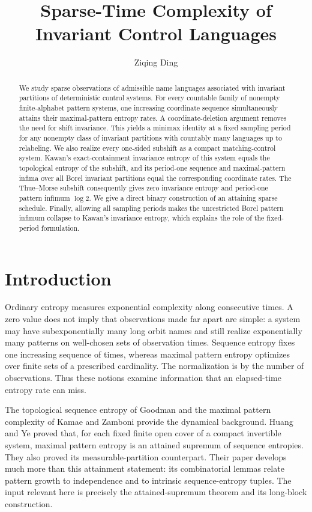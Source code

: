 \documentclass[11pt,reqno]{amsart}
\title{Sparse-Time Complexity of Invariant Control Languages}
\author{Ziqing Ding}
\date{}
\numberwithin{equation}{section}
\theoremstyle{definition}
\begin{document}
\begin{abstract}
We study sparse observations of admissible name languages associated with
invariant partitions of deterministic control systems. For every countable
family of nonempty finite-alphabet pattern systems, one increasing coordinate
sequence simultaneously attains their maximal-pattern entropy rates. A
coordinate-deletion argument removes the need for shift invariance. This
yields a minimax identity at a fixed sampling period for any nonempty class
of invariant partitions with countably many languages up to relabeling.
We also realize every one-sided subshift as a compact matching-control
system. Kawan's exact-containment invariance entropy of this system equals
the topological entropy of the subshift, and its period-one sequence and maximal-pattern infima over all
Borel invariant partitions equal the corresponding coordinate rates.
The Thue--Morse subshift consequently gives zero invariance entropy and
period-one pattern infimum $\log 2$. We give a direct binary construction of
an attaining sparse schedule. Finally, allowing all sampling periods makes
the unrestricted Borel pattern infimum collapse to Kawan's invariance
entropy, which explains the role of the fixed-period formulation.
\end{abstract}

\maketitle

\section{Introduction}\label{sec:intro}

Ordinary entropy measures exponential complexity along consecutive times.
A zero value does not imply that observations made far apart are simple:
a system may have subexponentially many long orbit names and still realize
exponentially many patterns on well-chosen sets of observation times.
Sequence entropy fixes one increasing sequence of times, whereas maximal
pattern entropy optimizes over finite sets of a prescribed cardinality.
The normalization is by the number of observations. Thus these notions
examine information that an elapsed-time entropy rate can miss.

The topological sequence entropy of Goodman \cite{Goodman1974} and the
maximal pattern complexity of Kamae and Zamboni
\cite{KamaeZamboniWords2002,KamaeZamboniSystems2002} provide the dynamical
background. Huang and Ye \cite[Theorem~2.1]{HuangYe2009} proved that, for
each fixed finite open cover of a compact invertible system, maximal
pattern entropy is an attained supremum of sequence entropies. They also
proved its measurable-partition counterpart. Their paper develops much
more than this attainment statement: its combinatorial lemmas relate
pattern growth to independence and to intrinsic sequence-entropy tuples.
The input relevant here is precisely the attained-supremum theorem and
its long-block construction.
\end{document}
